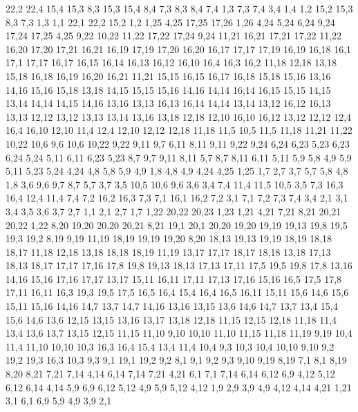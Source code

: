 22,2
22,4
15,4
15,3
%
8,3
15,3
15,4
8,4
%
7,3
8,3
8,4
7,4
%
1,3
7,3
7,4
3,4
1,4
%
1,2
15,2
15,3
8,3
7,3
1,3
%
1,1
22,1
22,2
15,2
1,2
1,25
4,25
17,25
17,26
1,26
%
4,24
5,24
6,24
9,24
17,24
17,25
4,25
%
9,22
10,22
11,22
17,22
17,24
9,24
%
11,21
16,21
17,21
17,22
11,22
%
16,20
17,20
17,21
16,21
%
16,19
17,19
17,20
16,20
%
16,17
17,17
17,19
16,19
16,18
%
16,1
17,1
17,17
16,17
16,15
16,14
16,13
16,12
16,10
16,4
16,3
16,2
%
11,18
12,18
13,18
15,18
16,18
16,19
16,20
16,21
11,21
%
15,15
16,15
16,17
16,18
15,18
15,16
%
13,16
14,16
15,16
15,18
13,18
%
14,15
15,15
15,16
14,16
%
14,14
16,14
16,15
15,15
14,15
%
13,14
14,14
14,15
14,16
13,16
%
13,13
16,13
16,14
14,14
13,14
%
13,12
16,12
16,13
13,13
%
12,12
13,12
13,13
13,14
13,16
13,18
12,18
%
12,10
16,10
16,12
13,12
12,12
%
12,4
16,4
16,10
12,10
%
11,4
12,4
12,10
12,12
12,18
11,18
11,5
%
10,5
11,5
11,18
11,21
11,22
10,22
10,6
%
9,6
10,6
10,22
9,22
9,11
9,7
%
6,11
8,11
9,11
9,22
9,24
6,24
6,23
%
5,23
6,23
6,24
5,24
%
5,11
6,11
6,23
5,23
%
8,7
9,7
9,11
8,11
%
5,7
8,7
8,11
6,11
5,11
5,9
5,8
%
4,9
5,9
5,11
5,23
5,24
4,24
%
4,8
5,8
5,9
4,9
%
1,8
4,8
4,9
4,24
4,25
1,25
%
1,7
2,7
3,7
5,7
5,8
4,8
1,8
%
3,6
9,6
9,7
8,7
5,7
3,7
%
3,5
10,5
10,6
9,6
3,6
%
3,4
7,4
11,4
11,5
10,5
3,5
%
7,3
16,3
16,4
12,4
11,4
7,4
%
7,2
16,2
16,3
7,3
%
7,1
16,1
16,2
7,2
%
3,1
7,1
7,2
7,3
7,4
3,4
%
2,1
3,1
3,4
3,5
3,6
3,7
2,7
%
1,1
2,1
2,7
1,7
1,22
20,22
20,23
1,23
%
1,21
4,21
7,21
8,21
20,21
20,22
1,22
%
8,20
19,20
20,20
20,21
8,21
%
19,1
20,1
20,20
19,20
19,19
19,13
19,8
19,5
19,3
19,2
%
8,19
9,19
11,19
18,19
19,19
19,20
8,20
%
18,13
19,13
19,19
18,19
18,18
18,17
%
11,18
12,18
13,18
18,18
18,19
11,19
%
13,17
17,17
18,17
18,18
13,18
%
17,13
18,13
18,17
17,17
17,16
%
17,8
19,8
19,13
18,13
17,13
17,11
%
17,5
19,5
19,8
17,8
%
13,16
14,16
15,16
17,16
17,17
13,17
%
15,11
16,11
17,11
17,13
17,16
15,16
%
16,5
17,5
17,8
17,11
16,11
%
16,3
19,3
19,5
17,5
16,5
16,4
%
15,4
16,4
16,5
16,11
15,11
15,6
%
14,6
15,6
15,11
15,16
14,16
14,7
%
13,7
14,7
14,16
13,16
13,15
%
13,6
14,6
14,7
13,7
%
13,4
15,4
15,6
14,6
13,6
%
12,15
13,15
13,16
13,17
13,18
12,18
%
11,15
12,15
12,18
11,18
%
11,4
13,4
13,6
13,7
13,15
12,15
11,15
11,10
%
9,10
10,10
11,10
11,15
11,18
11,19
9,19
%
10,4
11,4
11,10
10,10
%
10,3
16,3
16,4
15,4
13,4
11,4
10,4
%
9,3
10,3
10,4
10,10
9,10
%
9,2
19,2
19,3
16,3
10,3
9,3
%
9,1
19,1
19,2
9,2
%
8,1
9,1
9,2
9,3
9,10
9,19
8,19
%
7,1
8,1
8,19
8,20
8,21
7,21
7,14
%
4,14
6,14
7,14
7,21
4,21
%
6,1
7,1
7,14
6,14
6,12
6,9
%
4,12
5,12
6,12
6,14
4,14
%
5,9
6,9
6,12
5,12
%
4,9
5,9
5,12
4,12
%
1,9
2,9
3,9
4,9
4,12
4,14
4,21
1,21
%
3,1
6,1
6,9
5,9
4,9
3,9
%
2,1
